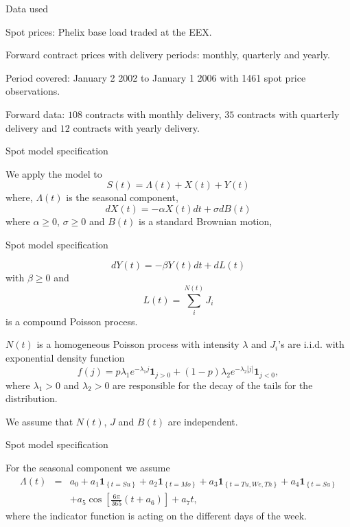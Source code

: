 


{Data used}






	Spot prices: Phelix base load traded at the EEX.


	Forward contract prices with delivery periods: monthly, quarterly and yearly.


	Period covered: January 2 2002 to January 1 2006 with 1461 spot price
observations.


	Forward data: $108$ contracts with
monthly delivery, $35$ contracts with quarterly delivery and $12$
contracts with yearly delivery.





{Spot model specification}

We apply the model to
\[S(t)=\Lambda(t)+X(t)+Y(t)\]
where, $\Lambda(t)$ is the seasonal component,
\begin{equation}
dX(t)=-\alpha X(t)dt+\sigma dB(t)
\end{equation}
where $\alpha\geq 0$,  $\sigma \geq 0$ and $B(t)$ is a
standard Brownian motion,

{Spot model specification}

\begin{equation}
dY(t)=-\beta Y(t)dt+dL(t)
\end{equation}
with $\beta \geq 0$ and
\begin{equation}
L(t)=\sum^{N(t)}_iJ_i
\end{equation}
is a compound Poisson process.

$N(t)$ is a homogeneous Poisson
process with intensity $\lambda$ and $J_i$'s are i.i.d. with
exponential density function
\[f(j)=p\lambda_1e^{-\lambda_1j}\textbf{1}_{j>0}+(1-p)\lambda_2e^{-\lambda_2|j|}\textbf{1}_{j<0},\]
where $\lambda_1>0$ and $\lambda_2>0$ are responsible for the
decay of the tails for the distribution.

We assume that $N(t)$, $J$ and $B(t)$ are independent.

{Spot model specification}

For the seasonal component we assume
\begin{eqnarray*}
\Lambda(t) & = & a_0+a_1\textbf{1}_{\left\{t=Su\right\}}+a_2\textbf{1}_{\left\{t=Mo\right\}}+a_3\textbf{1}_{\left\{t=Tu,We,Th\right\}}+a_4\textbf{1}_{\left\{t=Sa\right\}} \\
& & +a_5\cos\left[\frac{6\pi}{365}\left(t+a_6\right)\right]+a_7t,
\end{eqnarray*}
where the indicator function is acting on the different days of the
week.

